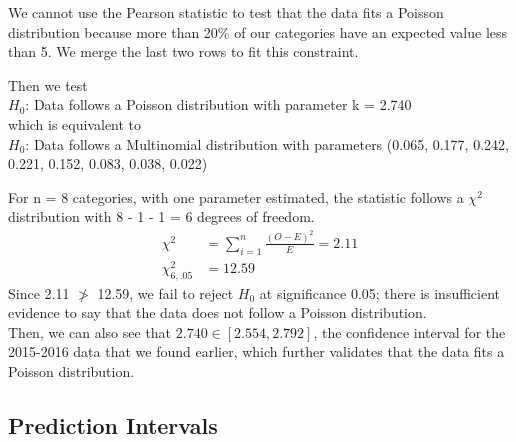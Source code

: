 \documentclass[12pt, titlepage]{article}
\begin{document}
We cannot use the Pearson statistic to test that the data fits a Poisson distribution because more than 20\% of our categories have an expected value less than 5. We merge the last two rows to fit this constraint.

\pagebreak
\noindent Then we test \\
$H_0$: Data follows a Poisson distribution with parameter k = 2.740 \\
which is equivalent to \\
$H_0$: Data follows a Multinomial distribution with parameters (0.065, 0.177, 0.242, 0.221, 0.152, 0.083, 0.038, 0.022)

\noindent For n = 8 categories, with one parameter estimated, the statistic follows a $\chi^2$ distribution with 8 - 1 - 1 = 6 degrees of freedom.
\begin{equation*}
\begin{split}
  \chi^2 & = \sum_{i = 1}^n \frac{(O - E)^2}{E} = 2.11 \\
  \chi^2_{6, .05} & = 12.59
\end{split}
\end{equation*}
Since 2.11 $\ngtr$ 12.59, we fail to reject $H_0$ at significance 0.05; there is insufficient evidence to say that the data does not follow a Poisson distribution.\\

\noindent Then, we can also see that $2.740 \in [2.554, 2.792]$, the confidence interval for the 2015-2016 data that we found earlier, which further validates that the data fits a Poisson distribution.

\subsection{Prediction Intervals}
\end{document}

